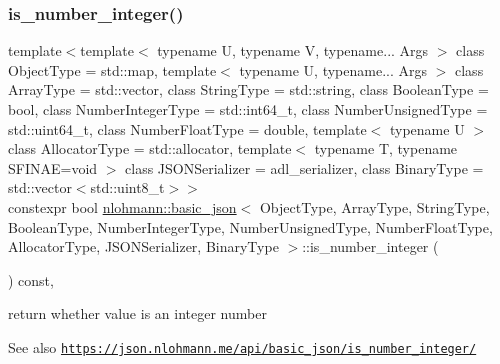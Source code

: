\subsubsection{\texorpdfstring{is\+\_\+number\+\_\+integer()}{is\_number\_integer()}}
{\footnotesize\ttfamily template$<$template$<$ typename U, typename V, typename... Args $>$ class Object\+Type = std\+::map, template$<$ typename U, typename... Args $>$ class Array\+Type = std\+::vector, class String\+Type  = std\+::string, class Boolean\+Type  = bool, class Number\+Integer\+Type  = std\+::int64\+\_\+t, class Number\+Unsigned\+Type  = std\+::uint64\+\_\+t, class Number\+Float\+Type  = double, template$<$ typename U $>$ class Allocator\+Type = std\+::allocator, template$<$ typename T, typename S\+F\+I\+N\+A\+E=void $>$ class J\+S\+O\+N\+Serializer = adl\+\_\+serializer, class Binary\+Type  = std\+::vector$<$std\+::uint8\+\_\+t$>$$>$ \\
constexpr bool \hyperlink{classnlohmann_1_1basic__json}{nlohmann\+::basic\+\_\+json}$<$ Object\+Type, Array\+Type, String\+Type, Boolean\+Type, Number\+Integer\+Type, Number\+Unsigned\+Type, Number\+Float\+Type, Allocator\+Type, J\+S\+O\+N\+Serializer, Binary\+Type $>$\+::is\+\_\+number\+\_\+integer (\begin{DoxyParamCaption}{ }\end{DoxyParamCaption}) const\hspace{0.3cm}{\ttfamily [inline]}, {\ttfamily [noexcept]}}



return whether value is an integer number 

\begin{DoxySeeAlso}{See also}
\href{https://json.nlohmann.me/api/basic_json/is_number_integer/}{\tt https\+://json.\+nlohmann.\+me/api/basic\+\_\+json/is\+\_\+number\+\_\+integer/} 
\end{DoxySeeAlso}
\mbox{\label{classnlohmann_1_1basic__json_a5493f2ed1e07b0ece428bd5a47e2fb95}} 
